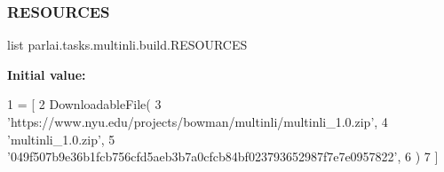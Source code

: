 \subsubsection{\texorpdfstring{R\+E\+S\+O\+U\+R\+C\+ES}{RESOURCES}}
{\footnotesize\ttfamily list parlai.\+tasks.\+multinli.\+build.\+R\+E\+S\+O\+U\+R\+C\+ES}

{\bfseries Initial value\+:}
\begin{DoxyCode}
1 =  [
2     DownloadableFile(
3         \textcolor{stringliteral}{'https://www.nyu.edu/projects/bowman/multinli/multinli\_1.0.zip'},
4         \textcolor{stringliteral}{'multinli\_1.0.zip'},
5         \textcolor{stringliteral}{'049f507b9e36b1fcb756cfd5aeb3b7a0cfcb84bf023793652987f7e7e0957822'},
6     )
7 ]
\end{DoxyCode}
